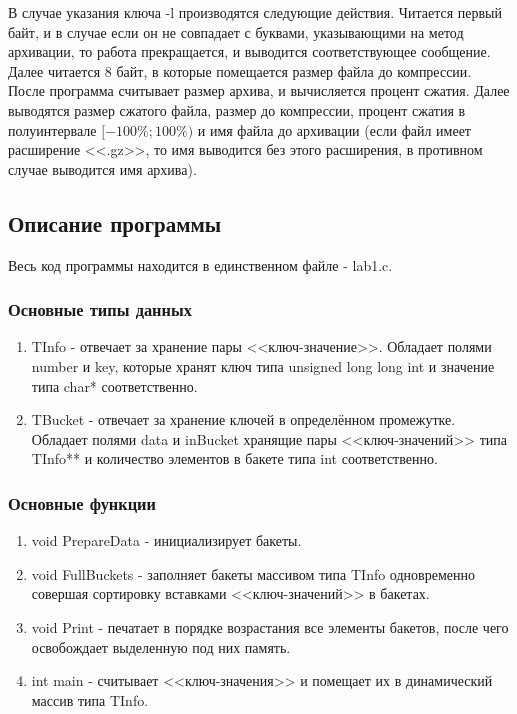 \documentclass[12pt]{article}
\begin{document}
В случае указания ключа -l производятся следующие действия. Читается первый байт, и в случае если он не совпадает с буквами, указывающими на метод архивации, то работа прекращается, и выводится соответствующее сообщение. Далее читается 8 байт, в которые помещается размер файла до компрессии. После программа считывает размер архива, и вычисляется процент сжатия. Далее выводятся размер сжатого файла, размер до компрессии, процент сжатия в полуинтервале $[-100\%; 100\%)$ и имя файла до архивации (если файл имеет расширение <<.gz>>, то имя выводится без этого расширения, в противном случае выводится имя архива).

\subsection*{Описание программы}

 Весь код  программы находится в единственном файле - lab1.c.

\subsubsection*{Основные типы данных}

\begin{enumerate}
\item TInfo - отвечает за хранение пары <<ключ-значение>>. Обладает полями number и key, которые хранят ключ типа unsigned long long int и значение типа char* соответственно.
\item TBucket - отвечает за хранение ключей в определённом промежутке. Обладает полями data и inBucket хранящие пары <<ключ-значений>> типа TInfo** и количество элементов в бакете типа int соответственно.
\end{enumerate}

\subsubsection*{Основные функции}

\begin{enumerate}
\item void PrepareData - инициализирует бакеты.
\item void FullBuckets - заполняет бакеты массивом типа TInfo одновременно совершая сортировку вставками <<ключ-значений>> в бакетах.
\item void Print - печатает в порядке возрастания все элементы бакетов, после чего освобождает выделенную под них память.
\item int main - считывает <<ключ-значения>> и помещает их в динамический массив типа TInfo.
\end{enumerate}
\end{document}
